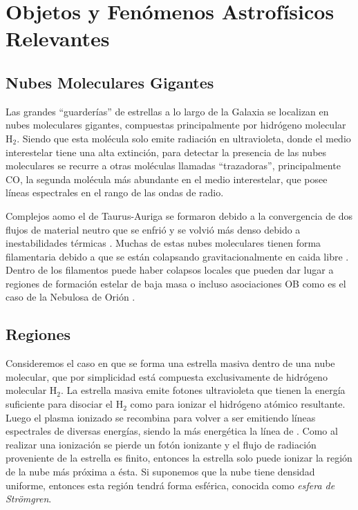 \chapter[Objetos Relevantes]{Objetos y Fenómenos Astrofísicos Relevantes}
\thispagestyle{empty}
\section{Nubes Moleculares Gigantes}

Las grandes ``guarderías'' de estrellas a lo largo de la Galaxia se localizan en nubes moleculares gigantes, compuestas principalmente por hidrógeno molecular $\mathrm{H_2}$.
Siendo que esta molécula solo emite radiación en ultravioleta, donde el medio interestelar tiene una alta extinción, para detectar la presencia de las nubes moleculares se recurre a otras moléculas llamadas ``trazadoras'', principalmente $\mathrm{CO}$, la segunda molécula más abundante en el medio interestelar, que posee líneas espectrales en el rango de las ondas de radio.

Complejos aomo el de Taurus-Auriga se formaron debido a la convergencia de dos flujos de material neutro \citep{Ballesteros:1999} que se enfrió y se volvió más denso debido a inestabilidades térmicas \citep{Hennebelle:1999}. Muchas de estas nubes moleculares tienen forma filamentaria debido a que se están colapsando gravitacionalmente en caida libre \citep{Ballesteros:2011}. Dentro de los filamentos puede haber colapsos locales que pueden dar lugar a regiones de formación estelar de baja masa o incluso asociaciones OB como es el caso de la Nebulosa de Orión \citep{Hartmann:2007}.

\section[Regiones \Ion{H}{II}]{Regiones  \citep{Stahler:2004}}
\label{sec:HII}
\newcommand\Nio{\ensuremath{\mathcal{N}}}

Consideremos el caso en que se forma una estrella masiva dentro de una nube molecular, que por simplicidad está compuesta exclusivamente de hidrógeno molecular $\mathrm{H_2}$. La estrella masiva emite fotones ultravioleta que tienen la energía suficiente para disociar el $\mathrm{H_2}$  como para ionizar el hidrógeno atómico resultante. Luego el plasma ionizado se recombina para volver a ser  emitiendo líneas espectrales de diversas energías, siendo la más energética la línea de . Como al realizar una ionización se pierde un fotón ionizante y el flujo de radiación proveniente de la estrella es finito, entonces la estrella solo puede ionizar la región de la nube más próxima a ésta. Si suponemos que la nube tiene densidad uniforme, entonces esta región tendrá forma esférica, conocida como \textit{esfera de Strömgren}.

